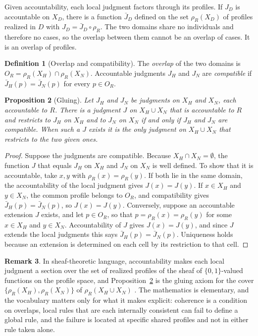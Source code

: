 \documentclass[11pt]{article}
\theoremstyle{definition}
\newtheorem{definition}{Definition}[section]
\theoremstyle{plain}
\newtheorem{proposition}[definition]{Proposition}
\theoremstyle{definition}
\newtheorem{remark}[definition]{Remark}
\newcommand{\Judg}{J}
\newcommand{\prof}{\rho}
\newcommand{\Rel}{R}
\begin{document}
Given accountability, each local judgment factors through its profiles. If $\Judg_D$ is accountable on $X_D$, there is a function $\bar\Judg_D$ defined on the set $\prof_{\Rel}(X_D)$ of profiles realized in $D$ with $\Judg_D=\bar\Judg_D\circ\prof_{\Rel}$. The two domains share no individuals and therefore no cases, so the overlap between them cannot be an overlap of cases. It is an overlap of profiles.

\begin{definition}[Overlap and compatibility]
The \emph{overlap} of the two domains is $O_{\Rel}=\prof_{\Rel}(X_H)\cap\prof_{\Rel}(X_N)$. Accountable judgments $\Judg_H$ and $\Judg_N$ are \emph{compatible} if $\bar\Judg_H(p)=\bar\Judg_N(p)$ for every $p\in O_{\Rel}$.
\end{definition}

\begin{proposition}[Gluing]\label{prop:gluing}
Let $\Judg_H$ and $\Judg_N$ be judgments on $X_H$ and $X_N$, each accountable to $\Rel$. There is a judgment $\Judg$ on $X_H\cup X_N$ that is accountable to $\Rel$ and restricts to $\Judg_H$ on $X_H$ and to $\Judg_N$ on $X_N$ if and only if $\Judg_H$ and $\Judg_N$ are compatible. When such a $\Judg$ exists it is the only judgment on $X_H\cup X_N$ that restricts to the two given ones.
\end{proposition}

\begin{proof}
Suppose the judgments are compatible. Because $X_H\cap X_N=\emptyset$, the function $\Judg$ that equals $\Judg_H$ on $X_H$ and $\Judg_N$ on $X_N$ is well defined. To show that it is accountable, take $x,y$ with $\prof_{\Rel}(x)=\prof_{\Rel}(y)$. If both lie in the same domain, the accountability of the local judgment gives $\Judg(x)=\Judg(y)$. If $x\in X_H$ and $y\in X_N$, the common profile belongs to $O_{\Rel}$, and compatibility gives $\bar\Judg_H(p)=\bar\Judg_N(p)$, so $\Judg(x)=\Judg(y)$. Conversely, suppose an accountable extension $\Judg$ exists, and let $p\in O_{\Rel}$, so that $p=\prof_{\Rel}(x)=\prof_{\Rel}(y)$ for some $x\in X_H$ and $y\in X_N$. Accountability of $\Judg$ gives $\Judg(x)=\Judg(y)$, and since $\Judg$ extends the local judgments this says $\bar\Judg_H(p)=\bar\Judg_N(p)$. Uniqueness holds because an extension is determined on each cell by its restriction to that cell.
\end{proof}

\begin{remark}
In sheaf-theoretic language, accountability makes each local judgment a section over the set of realized profiles of the sheaf of $\{0,1\}$-valued functions on the profile space, and Proposition~\ref{prop:gluing} is the gluing axiom for the cover $\{\prof_{\Rel}(X_H),\prof_{\Rel}(X_N)\}$ of $\prof_{\Rel}(X_H\cup X_N)$ \cite{maclane1992}. The mathematics is elementary, and the vocabulary matters only for what it makes explicit: coherence is a condition on overlaps, local rules that are each internally consistent can fail to define a global rule, and the failure is located at specific shared profiles and not in either rule taken alone.
\end{remark}
\end{document}
